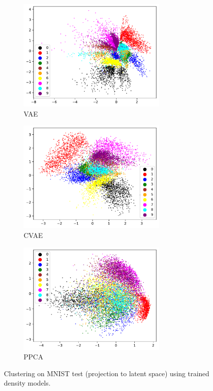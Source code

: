 \begin{figure}[H]
	\begin{subfigure}[t]{0.49\textwidth}
		\centering
		\includegraphics[width = 0.8\textwidth]{figures/VAE/clustering}
		\caption{VAE}
		\label{fig:vae:clustering}
	\end{subfigure}
	\begin{subfigure}[t]{0.49\textwidth}
		\centering
		\includegraphics[width = 0.8\textwidth]{figures/CVAE/clustering}
		\caption{CVAE}
		\label{fig:cvae:clustering}
	\end{subfigure}
	\begin{subfigure}[t]{0.49\textwidth}
		\centering
		\includegraphics[width = 0.8\textwidth]{figures/ppca/clustering}
		\caption{PPCA}
		\label{fig:ppca:clustering}
	\end{subfigure}
	\caption{Clustering on MNIST test (projection to latent space) using trained density models.}	
\end{figure}

